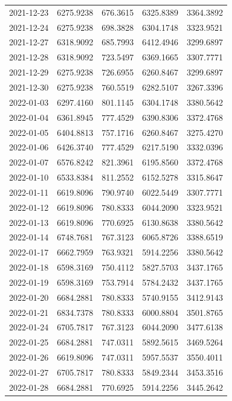 \begin{footnotesize}
\begin{longtable}{lllll}
2021-12-23 & 6275.9238 & 676.3615 & 6325.8389 & 3364.3892 \\
2021-12-24 & 6275.9238 & 698.3828 & 6304.1748 & 3323.9521 \\
2021-12-27 & 6318.9092 & 685.7993 & 6412.4946 & 3299.6897 \\
2021-12-28 & 6318.9092 & 723.5497 & 6369.1665 & 3307.7771 \\
2021-12-29 & 6275.9238 & 726.6955 & 6260.8467 & 3299.6897 \\
2021-12-30 & 6275.9238 & 760.5519 & 6282.5107 & 3267.3396 \\
2022-01-03 & 6297.4160 & 801.1145 & 6304.1748 & 3380.5642 \\
2022-01-04 & 6361.8945 & 777.4529 & 6390.8306 & 3372.4768 \\
2022-01-05 & 6404.8813 & 757.1716 & 6260.8467 & 3275.4270 \\
2022-01-06 & 6426.3740 & 777.4529 & 6217.5190 & 3332.0396 \\
2022-01-07 & 6576.8242 & 821.3961 & 6195.8560 & 3372.4768 \\
2022-01-10 & 6533.8384 & 811.2552 & 6152.5278 & 3315.8647 \\
2022-01-11 & 6619.8096 & 790.9740 & 6022.5449 & 3307.7771 \\
2022-01-12 & 6619.8096 & 780.8333 & 6044.2090 & 3323.9521 \\
2022-01-13 & 6619.8096 & 770.6925 & 6130.8638 & 3380.5642 \\
2022-01-14 & 6748.7681 & 767.3123 & 6065.8726 & 3388.6519 \\
2022-01-17 & 6662.7959 & 763.9321 & 5914.2256 & 3380.5642 \\
2022-01-18 & 6598.3169 & 750.4112 & 5827.5703 & 3437.1765 \\
2022-01-19 & 6598.3169 & 753.7914 & 5784.2432 & 3437.1765 \\
2022-01-20 & 6684.2881 & 780.8333 & 5740.9155 & 3412.9143 \\
2022-01-21 & 6834.7378 & 780.8333 & 6000.8804 & 3501.8765 \\
2022-01-24 & 6705.7817 & 767.3123 & 6044.2090 & 3477.6138 \\
2022-01-25 & 6684.2881 & 747.0311 & 5892.5615 & 3469.5264 \\
2022-01-26 & 6619.8096 & 747.0311 & 5957.5537 & 3550.4011 \\
2022-01-27 & 6705.7817 & 780.8333 & 5849.2344 & 3453.3516 \\
2022-01-28 & 6684.2881 & 770.6925 & 5914.2256 & 3445.2642 \\

\end{longtable}
\end{footnotesize}
